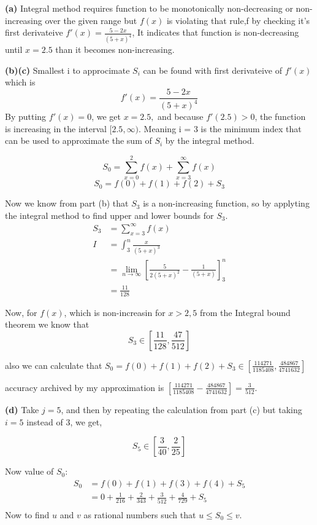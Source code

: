 \documentclass{article}
\begin{document}
\textbf{(a)} Integral method requires function to be monotonically non-decreasing or non-increasing over the given range but $f(x)$ is violating that rule,f
by checking it's first derivateive $f'(x) = \frac{5 -2x}{(5+x)^4}$, It indicates that function is non-decreasing until $x=2.5$ than it becomes non-increasing.

\vspace{\baselineskip}
\noindent\textbf{(b)(c)}
Smallest i to approcimate $S_i$ can be found with first derivateive of $f'(x)$ which is 
\[f'(x) = \frac{5 -2x}{(5+x)^4}\]
By putting $f'(x) = 0$, we get $x = 2.5,$ and because $f'(2.5) > 0$, the function is increasing in the interval $[2.5,\infty)$. Meaning i = 3 is the minimum index that can be used to
approximate the sum of $S_i$ by the integral method.

\[S_0 = \sum_{x=0}^{2} f(x) + \sum_{x=3}^{\infty} f(x)\]
\[S_0 = f(0) + f(1) + f(2) + S_3\]

Now we know from part (b) that $S_3$ is a non-increasing function, so by applyting the integral method to find upper and lower bounds for $S_3$.
\[
\begin{aligned}
  S_3 &= \sum_{x = 3}^{\infty} f(x) \\
  I &= \int_{3}^{n} \frac{x}{(5+x)^3} \\
    &= \lim_{n \rightarrow \infty} \left[ \frac{5}{2(5+x)^2} - \frac{1}{(5+x)} \right]_3^n \\
    &= \frac{11}{128}
\end{aligned}
\]

Now, for $f(x)$, which is non-increasin for $x > 2,5$ from the Integral bound theorem we know that 
\[ S_3 \in \left[\frac{11}{128},\frac{47}{512} \right] \]

also we can calculate that $S_0 = f(0) + f(1) + f(2) + S_3 \in \left[ \frac{114271}{1185408},\frac{484867}{4741632} \right]$

accuracy archived by my approximation is $ \left[ \frac{114271}{1185408} - \frac{484867}{4741632} \right] = \frac{3}{512} $.

\vspace{\baselineskip}
\noindent\textbf{(d)} 
Take $j = 5$, and then by repeating the calculation from part (c) but taking $i = 5$ instead of $3$, we get,

\[S_5 \in [\frac{3}{40},\frac{2}{25}]\]

Now value of $S_0$:
\[
\begin{aligned}
  S_0 &= f(0)+f(1)+f(3)+f(4)+S_5 \\
      &= 0 + \frac{1}{216} + \frac{2}{343} + \frac{3}{512} + \frac{4}{729} + S_5 \\
\end{aligned}
\]
Now to find $u$ and $v$ as rational numbers such that $u \leq S_0 \leq v$.
\end{document}
